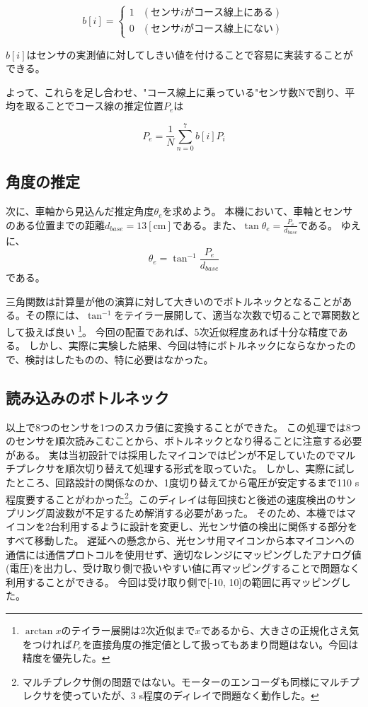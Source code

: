 \documentclass{ltjsreport}
\begin{document}
\begin{equation}
  b[i] = 
  \begin{cases}
   1 & (センサiがコース線上にある) \\
   0 & (センサiがコース線上にない)
   \end{cases}
\end{equation}

$b[i]$はセンサの実測値に対してしきい値を付けることで容易に実装することができる。

よって、これらを足し合わせ、"コース線上に乗っている"センサ数Nで割り、平均を取ることでコース線の推定位置$P_e$は

\[ 
  P_e = \frac{1}{N} \sum_{n=0}^7 b[i] P_i
    \]

\subsection{角度の推定}

次に、車軸から見込んだ推定角度$\theta_e$を求めよう。
本機において、車軸とセンサのある位置までの距離$d_{base} = 13 [\mathrm{cm}]$である。また、$\tan \theta_e = \frac{P_e}{d_{base}}$である。
ゆえに、
\[
  \theta_e =  \tan^{-1} \frac{P_e}{d_{base}}
\]
である。

三角関数は計算量が他の演算に対して大きいのでボトルネックとなることがある。その際には、$\tan^{-1}$をテイラー展開して、適当な次数で切ることで冪関数として扱えば良い
\footnote{$\arctan x$のテイラー展開は2次近似まで$x$であるから、大きさの正規化さえ気をつければ$P_e$を直接角度の推定値として扱ってもあまり問題はない。今回は精度を優先した。}。
今回の配置であれば、5次近似程度あれば十分な精度である。
しかし、実際に実験した結果、今回は特にボトルネックにならなかったので、検討はしたものの、特に必要はなかった。

\subsection{読み込みのボトルネック}
以上で8つのセンサを1つのスカラ値に変換することができた。
この処理では8つのセンサを順次読みこむことから、ボトルネックとなり得ることに注意する必要がある。
実は当初設計では採用したマイコンではピンが不足していたのでマルチプレクサを順次切り替えて処理する形式を取っていた。
しかし、実際に試したところ、回路設計の関係なのか、1度切り替えてから電圧が安定するまで110 \mu s 程度要することがわかった\footnote{マルチプレクサ側の問題ではない。モーターのエンコーダも同様にマルチプレクサを使っていたが、3 \mu s程度のディレイで問題なく動作した。}。このディレイは毎回挟むと後述の速度検出のサンプリング周波数が不足するため解消する必要があった。
そのため、本機ではマイコンを2台利用するように設計を変更し、光センサ値の検出に関係する部分をすべて移動した。
遅延への懸念から、光センサ用マイコンから本マイコンへの通信には通信プロトコルを使用せず、適切なレンジにマッピングしたアナログ値(電圧)を出力し、受け取り側で扱いやすい値に再マッピングすることで問題なく利用することができる。
今回は受け取り側で[-10, 10]の範囲に再マッピングした。
\end{document}
